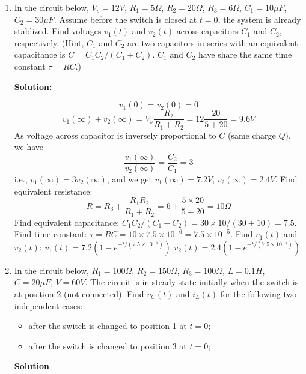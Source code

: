 \begin{enumerate}
\item In the circuit below, $V_s=12V$, $R_1=5\Omega$, $R_2=20\Omega$,
  $R_3=6\Omega$, $C_1=10\mu F$, $C_2=30\mu F$. Assume before the switch 
  is closed at $t=0$, the system is already stablized. Find voltages
  $v_1(t)$ and $v_2(t)$ across capacitors $C_1$ and $C_2$, respectively.
  (Hint, $C_1$ and $C_2$ are two capacitors in series with an equivalent
  capacitance is $C=C_1 C_2/(C_1+C_2)$. $C_1$ and $C_2$ have share the same
  time constant $\tau=RC$.)


  {\bf Solution:}
 
  \[ v_1(0)=v_2(0)=0	\]
  \[ v_1(\infty)+v_2(\infty)=V_s \frac{R_2}{R_1+R_2}
  	=12 \frac{20}{5+20}=9.6V	\]
  As voltage across capacitor is inversely proportional to $C$ (same charge 
  $Q$), we have
  \[	\frac{v_1(\infty)}{v_2(\infty)}=\frac{C_2}{C_1}=3	\]
  i.e., $v_1(\infty)=3v_2(\infty)$, and we get $v_1(\infty)=7.2V$,
  $v_2(\infty)=2.4V$.
  Find equivalent resistance: 
  \[ R=R_3+\frac{R_1 R_2}{R_1+R_2}=6+\frac{5\times 20}{5+20}=10\Omega \]
  Find equivalent capacitance: $C_1 C_2/(C_1+C_2)=30\times 10/(30+10)=7.5$. 
  Find time constant: $\tau=RC=10\times 7.5\times 10^{-6}=7.5\times 10^{-5}$.
  Find $v_1(t)$ and $v_2(t)$:
  $v_1(t)=7.2(1-e^{-t/(7.5\times 10^{-5})})$
  $v_2(t)=2.4(1-e^{-t/(7.5\times 10^{-5})})$

\item In the circuit below, $R_1=100\Omega$, $R_2=150\Omega$, $R_3=100\Omega$,
  $L=0.1H$, $C=20\mu F$, $V=60V$. The circuit is in steady state initially when 
  the switch is at position 2 (not connected). Find $v_C(t)$ and $i_L(t)$ for the 
  following two independent cases:
  \begin{itemize}
    \item after the switch is changed to position 1 at $t=0$;
    \item after the switch is changed to position 3 at $t=0$;
  \end{itemize}
  


  {\bf Solution}


\end{enumerate}
